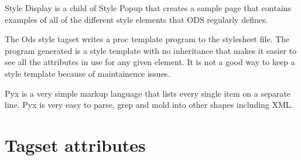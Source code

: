 \begin{description}
Style Display is a child of Style Popup that creates a sample page that contains
examples of all of the different style elements that ODS regularly defines.


The Ods style tagset writes a proc template program to the stylesheet file.
The program generated is a style template with no inheritance that makes it
easier to see all the attributes in use for any given element.  It is not a
good way to keep a style template because of maintainence issues.


Pyx is a very simple markup language that lists every single item on a separate
line.  Pyx is very easy to parse, grep and mold into other shapes including XML.


 


\end{description}

\section{Tagset attributes}

